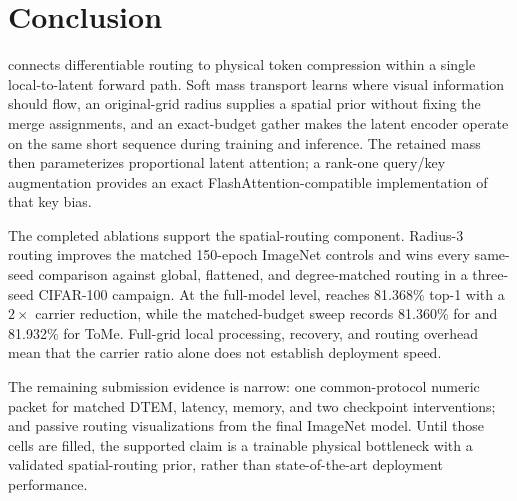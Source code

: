 \section{Conclusion}

\mn{} connects differentiable routing to physical token compression within a
single local-to-latent forward path. Soft mass transport learns where visual
information should flow, an original-grid radius supplies a spatial prior
without fixing the merge assignments, and an exact-budget gather makes the
latent encoder operate on the same short sequence during training and
inference. The retained mass then parameterizes proportional latent attention;
a rank-one query/key augmentation provides an exact FlashAttention-compatible
implementation of that key bias.

The completed ablations support the spatial-routing component. Radius-3
routing improves the matched 150-epoch ImageNet controls and wins every
same-seed comparison against global, flattened, and degree-matched routing in
a three-seed CIFAR-100 campaign. At the full-model level,
\mn{} reaches 81.368\% top-1 with a $2\times$ carrier reduction, while the
matched-budget sweep records 81.360\% for \mn{} and 81.932\% for ToMe.
Full-grid local processing, recovery, and routing overhead mean that the
carrier ratio alone does not establish deployment speed.

The remaining submission evidence is narrow: one common-protocol numeric
packet for matched DTEM, latency, memory, and two checkpoint interventions;
and passive routing visualizations from the final ImageNet model. Until those
cells are filled, the supported claim is a trainable physical bottleneck with
a validated spatial-routing prior, rather than state-of-the-art deployment
performance.
